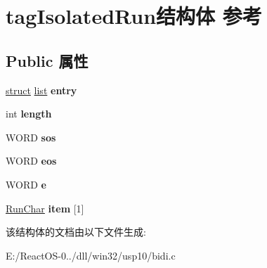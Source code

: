 \hypertarget{structtag_isolated_run}{}\section{tag\+Isolated\+Run结构体 参考}
\label{structtag_isolated_run}
\subsection*{Public 属性}
\begin{DoxyCompactItemize}
\item 
\mbox{\label{structtag_isolated_run_adb1d41c19252aecb72104f96dbe8a213}} 
\hyperlink{interfacestruct}{struct} \hyperlink{classlist}{list} {\bfseries entry}
\item 
\mbox{\label{structtag_isolated_run_a14f3775d7dc74a473453ac9e1f28e247}} 
int {\bfseries length}
\item 
\mbox{\label{structtag_isolated_run_aafda80d25e301e1b7ba78871e69ac2b0}} 
W\+O\+RD {\bfseries sos}
\item 
\mbox{\label{structtag_isolated_run_a7703f4f84585a95f82c5a65c189b4fc4}} 
W\+O\+RD {\bfseries eos}
\item 
\mbox{\label{structtag_isolated_run_ae4b06f83287950af77fb1926d26995d1}} 
W\+O\+RD {\bfseries e}
\item 
\mbox{\label{structtag_isolated_run_a0f3c4541ef22d20a853adb5b4be11b69}} 
\hyperlink{structtag_run_char}{Run\+Char} {\bfseries item} \mbox{[}1\mbox{]}
\end{DoxyCompactItemize}


该结构体的文档由以下文件生成\+:\begin{DoxyCompactItemize}
\item 
E\+:/\+React\+O\+S-\/0../dll/win32/usp10/bidi.\+c\end{DoxyCompactItemize}
